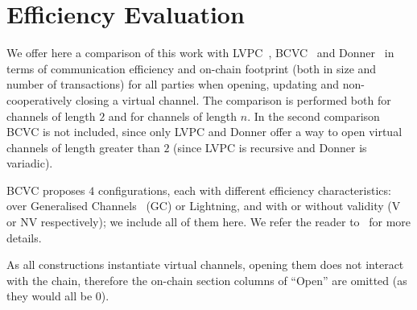 \section{Efficiency Evaluation}
  \label{section:comparison}
  We offer here a comparison of this work with
  LVPC~\cite{10.1007/978-3-030-65411-5_18}, BCVC~\cite{cryptoeprint:2020:554}
  and Donner~\cite{donner} in terms of communication efficiency and on-chain
  footprint (both in size and number of transactions) for all parties when
  opening, updating and non-cooperatively closing a virtual channel. The
  comparison is performed both for channels of length $2$ and for channels of
  length $n$. In the second comparison BCVC is not included, since only LVPC and
  Donner offer a way to open virtual channels of length greater than $2$ (since
  LVPC is recursive and Donner is variadic).

  BCVC proposes $4$ configurations, each with different efficiency
  characteristics: over Generalised Channels~\cite{cryptoeprint:2020:476} (GC)
  or Lightning, and with or without validity (V or NV respectively); we include
  all of them here. We refer the reader to~\cite{cryptoeprint:2020:554} for more
  details.

  As all constructions instantiate virtual channels, opening them does not
  interact with the chain, therefore the on-chain section columns of ``Open''
  are omitted (as they would all be $0$).

